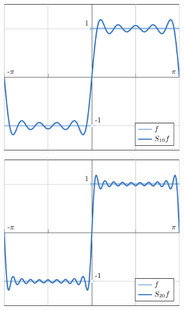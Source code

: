 \documentclass[a4paper, 12pt, oneside]{book}
\begin{document}
\begin{figure}[H]
\centering
\begin{subfigure}[b]{0.49\textwidth}
    \centering
    \includegraphics{./plot1/main.pdf}
\end{subfigure}
\begin{subfigure}[b]{0.49\textwidth}
    \centering
    \includegraphics{./plot2/main.pdf}
\end{subfigure}
\par\bigskip
\begin{subfigure}[b]{0.49\textwidth}
    \centering

\end{subfigure}
\end{figure}
\end{document}
